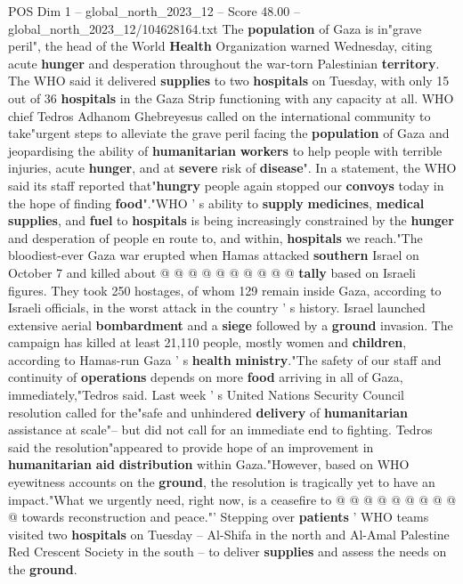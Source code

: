 \begin{textsample}{POS Dim 1 – global\_north\_2023\_12 – Score 48.00 – global\_north\_2023\_12/104628164.txt}  \label{ex:f1_pos_082}
The \textbf{population} of Gaza is in"grave peril", the head of the World \textbf{Health} Organization warned Wednesday, citing acute \textbf{hunger} and desperation throughout the war-torn Palestinian \textbf{territory}.
The WHO said it delivered \textbf{supplies} to two \textbf{hospitals} on Tuesday, with only 15 out of 36 \textbf{hospitals} in the Gaza Strip functioning with any capacity at all.
WHO chief Tedros Adhanom Ghebreyesus called on the international community to take"urgent steps to alleviate the grave peril facing the \textbf{population} of Gaza and jeopardising the ability of \textbf{humanitarian} \textbf{workers} to help people with terrible injuries, acute \textbf{hunger}, and at \textbf{severe} risk of \textbf{disease}".
In a statement, the WHO said its staff reported that"\textbf{hungry} people again stopped our \textbf{convoys} today in the hope of finding \textbf{food}"."WHO ' s ability to \textbf{supply} \textbf{medicines}, \textbf{medical} \textbf{supplies}, and \textbf{fuel} to \textbf{hospitals} is being increasingly constrained by the \textbf{hunger} and desperation of people en route to, and within, \textbf{hospitals} we reach."The bloodiest-ever Gaza war erupted when Hamas attacked \textbf{southern} Israel on October 7 and killed about @ @ @ @ @ @ @ @ @ @ \textbf{tally} based on Israeli figures.
They took 250 hostages, of whom 129 remain inside Gaza, according to Israeli officials, in the worst attack in the country ' s history.
Israel launched extensive aerial \textbf{bombardment} and a \textbf{siege} followed by a \textbf{ground} invasion.
The campaign has killed at least 21,110 people, mostly women and \textbf{children}, according to Hamas-run Gaza ' s \textbf{health} \textbf{ministry}."The safety of our staff and continuity of \textbf{operations} depends on more \textbf{food} arriving in all of Gaza, immediately,"Tedros said.
Last week ' s United Nations Security Council resolution called for the"safe and unhindered \textbf{delivery} of \textbf{humanitarian} assistance at scale"-- but did not call for an immediate end to fighting.
Tedros said the resolution"appeared to provide hope of an improvement in \textbf{humanitarian} \textbf{aid} \textbf{distribution} within Gaza."However, based on WHO eyewitness accounts on the \textbf{ground}, the resolution is tragically yet to have an impact."What we urgently need, right now, is a ceasefire to @ @ @ @ @ @ @ @ @ @ towards reconstruction and peace."' Stepping over \textbf{patients} ' WHO teams visited two \textbf{hospitals} on Tuesday -- Al-Shifa in the north and Al-Amal Palestine Red Crescent Society in the south -- to deliver \textbf{supplies} and assess the needs on the \textbf{ground}.

\end{textsample}

